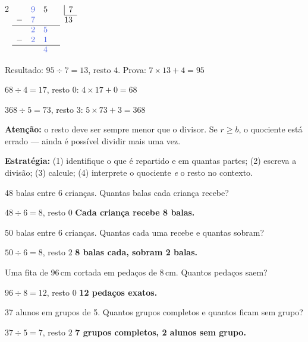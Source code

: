 \documentclass[12pt,twoside]{article}
\begin{document}
\begin{multicols}{2}
$\begin{array}[t]{lllll}
&\textcolor{iris}{9}&5&&\begin{array}[t]{|l}7\\\hline\end{array}\\
-&\textcolor{iris}{7}&&&13\\
\cline{1-4}
&\textcolor{iris}{2}&\textcolor{iris}{5}\\
-&\textcolor{iris}{2}&\textcolor{iris}{1}\\
\cline{1-4}
&&\textcolor{iris}{4}\\
\end{array}$

\vspace{4pt}
Resultado: $95 \div 7 = 13$, resto $4$. Prova: $7 \times 13 + 4 = 95$ \checkmark




$68 \div 4 = 17$, resto $0$: \quad $4 \times 17 + 0 = 68$ \checkmark

$368 \div 5 = 73$, resto $3$: \quad $5 \times 73 + 3 = 368$ \checkmark

\vspace{4pt}
\textbf{Atenção:} o resto deve ser sempre menor que o divisor. Se $r \geq b$, o quociente está errado — ainda é possível dividir mais uma vez.


\textbf{Estratégia:} (1) identifique o que é repartido e em quantas partes; (2) escreva a divisão; (3) calcule; (4) interprete o quociente \emph{e} o resto no contexto.


48 balas entre 6 crianças. Quantas balas cada criança recebe?

$48 \div 6 = 8$, resto $0$ \quad \textbf{Cada criança recebe 8 balas.} \checkmark


50 balas entre 6 crianças. Quantas cada uma recebe e quantas sobram?

$50 \div 6 = 8$, resto $2$ \quad \textbf{8 balas cada, sobram 2 balas.}


Uma fita de 96\,cm cortada em pedaços de 8\,cm. Quantos pedaços saem?

$96 \div 8 = 12$, resto $0$ \quad \textbf{12 pedaços exatos.} \checkmark


37 alunos em grupos de 5. Quantos grupos completos e quantos ficam sem grupo?

$37 \div 5 = 7$, resto $2$ \quad \textbf{7 grupos completos, 2 alunos sem grupo.}

\end{multicols}
\end{document}

